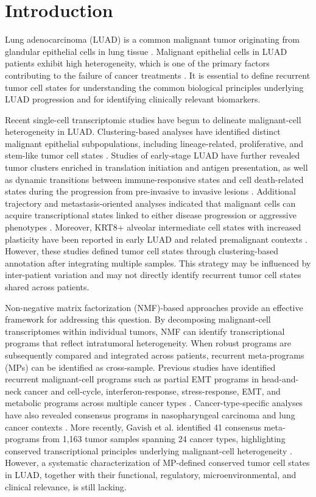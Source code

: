 \documentclass[pdflatex,sn-mathphys-num]{sn-jnl}%
\theoremstyle{thmstyleone}%
\theoremstyle{thmstyletwo}%
\theoremstyle{thmstylethree}%
\begin{document}
\section{Introduction}\label{sec1}
Lung adenocarcinoma (LUAD) is a common malignant tumor originating from glandular epithelial cells in lung tissue \cite {bib1}. Malignant epithelial cells in LUAD patients exhibit high heterogeneity, which is one of the primary factors contributing to the failure of cancer treatments \cite{bib2}. It is essential to define recurrent tumor cell states for understanding the common biological principles underlying LUAD progression and for identifying clinically relevant biomarkers.

Recent single-cell transcriptomic studies have begun to delineate malignant-cell heterogeneity in LUAD. Clustering-based analyses have identified distinct malignant epithelial subpopulations, including lineage-related, proliferative, and stem-like tumor cell states \cite{bib3,bib4}. Studies of early-stage LUAD have further revealed tumor clusters enriched in translation initiation and antigen presentation, as well as dynamic transitions between immune-responsive states and cell death-related states during the progression from pre-invasive to invasive lesions \cite{bib5,bib6}. Additional trajectory and metastasis‑oriented analyses indicated that malignant cells can acquire transcriptional states linked to either disease progression or aggressive phenotypes \cite{bib7,bib8}. Moreover, KRT8+ alveolar intermediate cell states with increased plasticity have been reported in early LUAD and related premalignant contexts \cite{bib9,bib10}. However, these studies defined tumor cell states through clustering-based annotation after integrating multiple samples. This strategy may be influenced by inter-patient variation and may not directly identify recurrent tumor cell states shared across patients.

Non-negative matrix factorization (NMF)-based approaches provide an effective framework for addressing this question. By decomposing malignant-cell transcriptomes within individual tumors, NMF can identify transcriptional programs that reflect intratumoral heterogeneity. When robust programs are subsequently compared and integrated across patients, recurrent meta-programs (MPs) can be identified as cross-sample. Previous studies have identified recurrent malignant-cell programs such as partial EMT programs in head-and-neck cancer and cell-cycle, interferon-response, stress-response, EMT, and metabolic programs across multiple cancer types \cite{bib11,bib12}. Cancer-type-specific analyses have also revealed consensus programs in nasopharyngeal carcinoma and lung cancer contexts \cite{bib13,bib14,bib15}. More recently, Gavish et al. identified 41 consensus meta-programs from 1,163 tumor samples spanning 24 cancer types, highlighting conserved transcriptional principles underlying malignant-cell heterogeneity \cite{bib16}. However, a systematic characterization of MP-defined conserved tumor cell states in LUAD, together with their functional, regulatory, microenvironmental, and clinical relevance, is still lacking.
\end{document}
